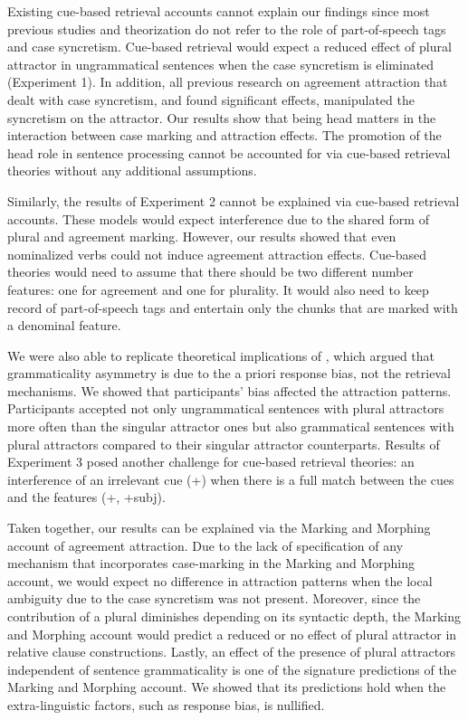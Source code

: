 Existing cue-based retrieval accounts cannot explain our findings since most previous studies and theorization do not refer to the role of part-of-speech tags and case syncretism. Cue-based retrieval would expect a reduced effect of plural attractor in ungrammatical sentences when the case syncretism is eliminated (Experiment 1). In addition, all previous research on agreement attraction that dealt with case syncretism, and found significant effects, manipulated the syncretism on the attractor. Our results show that being head matters in the interaction between case marking and attraction effects. The promotion of the head role in sentence processing cannot be accounted for via cue-based retrieval theories without any additional assumptions.

Similarly, the results of Experiment 2 cannot be explained via cue-based retrieval accounts. These models would expect interference due to the shared form of plural and agreement marking. However, our results showed that even nominalized verbs could not induce agreement attraction effects. Cue-based theories would need to assume that there should be two different number features: one for agreement and one for plurality. It would also need to keep record of part-of-speech tags and entertain only the chunks that are marked with a denominal feature.

We were also able to replicate theoretical implications of , which argued that grammaticality asymmetry is due to the a priori response bias, not the retrieval mechanisms. We showed that participants' bias affected the attraction patterns. Participants accepted not only ungrammatical sentences with plural attractors more often than the singular attractor ones but also grammatical sentences with plural attractors compared to their singular attractor counterparts. Results of Experiment 3 posed another challenge for cue-based retrieval theories: an interference of an irrelevant cue (+\Pl{}) when there is a full match between the cues and the features (+\Sg{}, +{subj}). 

Taken together, our results can be explained via the Marking and Morphing account of agreement attraction. Due to the lack of specification of any mechanism that incorporates case-marking in the Marking and Morphing account, we would expect no difference in attraction patterns when the local ambiguity due to the case syncretism was not present. Moreover, since the contribution of a plural diminishes depending on its syntactic depth, the Marking and Morphing account would predict a reduced or no effect of plural attractor in relative clause constructions. Lastly, an effect of the presence of plural attractors independent of sentence grammaticality is one of the signature predictions of the Marking and Morphing account. We showed that its predictions hold when the extra-linguistic factors, such as response bias, is nullified. 

